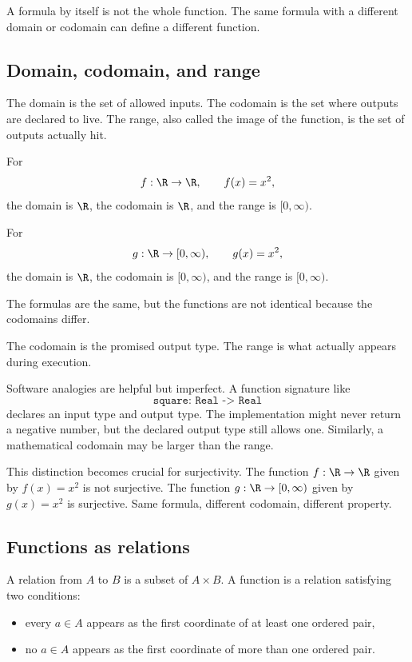 \begin{trapbox}
A formula by itself is not the whole function. The same formula with a different domain or codomain can define a different function.
\end{trapbox}

\subsection{Domain, codomain, and range}

The domain is the set of allowed inputs. The codomain is the set where outputs are declared to live. The range, also called the image of the function, is the set of outputs actually hit.

For
\[
f:\R\to\R,\qquad f(x)=x^2,
\]
the domain is $\R$, the codomain is $\R$, and the range is $[0,\infty)$.

For
\[
g:\R\to[0,\infty),\qquad g(x)=x^2,
\]
the domain is $\R$, the codomain is $[0,\infty)$, and the range is $[0,\infty)$.

The formulas are the same, but the functions are not identical because the codomains differ.

\begin{intuitionbox}
The codomain is the promised output type. The range is what actually appears during execution.
\end{intuitionbox}

Software analogies are helpful but imperfect. A function signature like
\[
\texttt{square: Real -> Real}
\]
declares an input type and output type. The implementation might never return a negative number, but the declared output type still allows one. Similarly, a mathematical codomain may be larger than the range.

This distinction becomes crucial for surjectivity. The function $f:\R\to\R$ given by $f(x)=x^2$ is not surjective. The function $g:\R\to[0,\infty)$ given by $g(x)=x^2$ is surjective. Same formula, different codomain, different property.

\subsection{Functions as relations}

A relation from $A$ to $B$ is a subset of $A\times B$. A function is a relation satisfying two conditions:

\begin{itemize}
\item every $a\in A$ appears as the first coordinate of at least one ordered pair,
\item no $a\in A$ appears as the first coordinate of more than one ordered pair.
\end{itemize}

